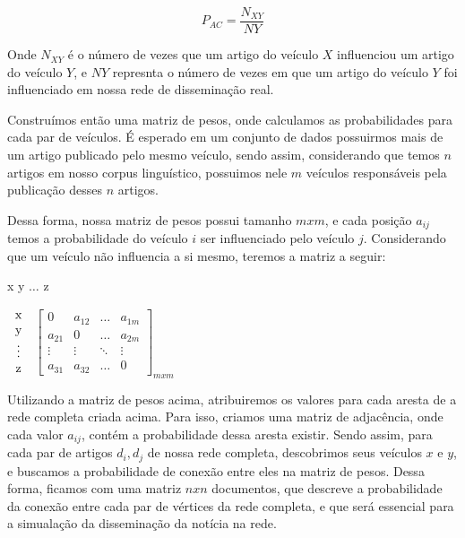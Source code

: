 \documentclass[a4paper,12pt]{article}
\begin{document}
 \begin{equation}
  P_{AC} = \dfrac{N_{XY}}{NY}
 \end{equation}

 
 Onde  $N_{XY}$ é o número de vezes que um artigo do veículo $X$ influenciou um artigo do veículo $Y$, e $NY$ represnta o número de vezes
 em que um artigo do veículo $Y$ foi influenciado em nossa rede de disseminação real.

 Construímos então uma matriz de pesos, onde calculamos as probabilidades para cada par de veículos. É esperado em um conjunto de 
 dados possuirmos mais de um artigo publicado pelo mesmo veículo, sendo assim, considerando que temos $n$ artigos em nosso corpus 
 linguístico, possuimos nele $m$ veículos responsáveis pela publicação desses $n$ artigos.

 Dessa forma, nossa matriz de pesos possui tamanho $mxm$, e cada posição $a_{ij}$ temos a probabilidade do veículo 
 $i$ ser influenciado pelo veículo $j$. Considerando que um veículo não influencia a si mesmo, teremos a matriz a seguir:
 
 \begin{center}
 \hspace{0.2cm}x \hspace{0.5cm} y \hspace{0.3cm} $\hdots$ \hspace{0.4cm}z
 
 \vspace{0.2cm}
 $
 \begin{tabular}{c}
   x \\
   y \\
   \vdots\\
   z
 \end{tabular}
$
 $
 \begin{bmatrix}
  0 & a_{12} & \hdots & a_{1m}\\
  a_{21} & 0 & \hdots & a_{2m}\\
  \vdots & \vdots & \ddots & \vdots\\
  a_{31} & a_{32} & \hdots & 0
 \end{bmatrix}_{mxm}
$

\end{center}

\vspace{0.4cm}

Utilizando a matriz de pesos acima, atribuiremos os valores para cada aresta de a rede completa criada acima. Para isso, criamos uma matriz
de adjacência, onde cada valor $a_{ij}$, contém a probabilidade dessa aresta existir.
Sendo assim, para cada par de artigos $d_{i},d_{j}$ de nossa rede completa,
descobrimos seus veículos $x$ e $y$, e buscamos a probabilidade de conexão entre eles na matriz de pesos. Dessa forma,
ficamos com uma matriz $nxn$ documentos, que descreve a probabilidade da conexão entre cada par de vértices da rede completa, e que será
essencial para a simualação da disseminação da notícia na rede.
  
\end{document}

